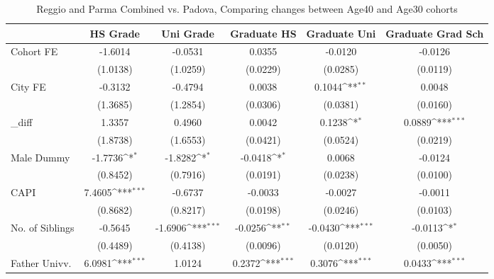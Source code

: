 \begin{table}[htbp]\centering
\def\sym#1{\ifmmode^{#1}\else\(^{#1}\)\fi}
\caption{Reggio and Parma Combined vs. Padova, Comparing changes between Age40 and Age30 cohorts}
\begin{tabular}{l*{5}{c}}
\toprule
            &\multicolumn{1}{c}{HS Grade}&\multicolumn{1}{c}{Uni Grade}&\multicolumn{1}{c}{Graduate HS}&\multicolumn{1}{c}{Graduate Uni}&\multicolumn{1}{c}{Graduate Grad Sch}\\
\midrule
Cohort FE   &     -1.6014         &     -0.0531         &      0.0355         &     -0.0120         &     -0.0126         \\
            &    (1.0138)         &    (1.0259)         &    (0.0229)         &    (0.0285)         &    (0.0119)         \\
\addlinespace
City FE     &     -0.3132         &     -0.4794         &      0.0038         &      0.1044\sym{**} &      0.0048         \\
            &    (1.3685)         &    (1.2854)         &    (0.0306)         &    (0.0381)         &    (0.0160)         \\
\addlinespace
\_diff       &      1.3357         &      0.4960         &      0.0042         &      0.1238\sym{*}  &      0.0889\sym{***}\\
            &    (1.8738)         &    (1.6553)         &    (0.0421)         &    (0.0524)         &    (0.0219)         \\
\addlinespace
Male Dummy  &     -1.7736\sym{*}  &     -1.8282\sym{*}  &     -0.0418\sym{*}  &      0.0068         &     -0.0124         \\
            &    (0.8452)         &    (0.7916)         &    (0.0191)         &    (0.0238)         &    (0.0100)         \\
\addlinespace
CAPI        &      7.4605\sym{***}&     -0.6737         &     -0.0033         &     -0.0027         &     -0.0011         \\
            &    (0.8682)         &    (0.8217)         &    (0.0198)         &    (0.0246)         &    (0.0103)         \\
\addlinespace
No. of Siblings&     -0.5645         &     -1.6906\sym{***}&     -0.0256\sym{**} &     -0.0430\sym{***}&     -0.0113\sym{*}  \\
            &    (0.4489)         &    (0.4138)         &    (0.0096)         &    (0.0120)         &    (0.0050)         \\
\addlinespace
Father Univv.&      6.0981\sym{***}&      1.0124         &      0.2372\sym{***}&      0.3076\sym{***}&      0.0433\sym{***}\\

\end{tabular}
\end{table}
